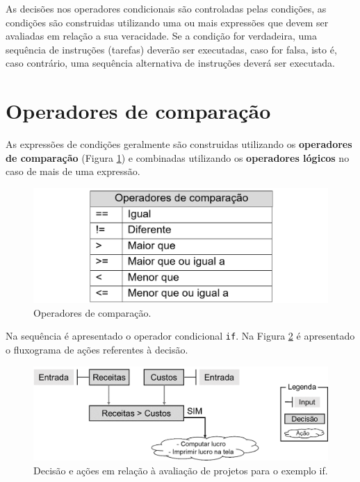 \documentclass[
  11pt,
  a5paper,
  openany]{book}
\begin{document}
As decisões nos operadores condicionais são controladas pelas condições, as condições são construidas utilizando uma ou mais expressões que devem ser avaliadas em relação a sua veracidade. Se a condição for verdadeira, uma sequência de instruções (tarefas) deverão ser executadas, caso for falsa, isto é, caso contrário, uma sequência alternativa de instruções deverá ser executada.

\hypertarget{operadores-de-comparauxe7uxe3o}{%
\section{Operadores de comparação}\label{operadores-de-comparauxe7uxe3o}}

As expressões de condições geralmente são construidas utilizando os \textbf{operadores de comparação} (Figura \ref{fig:FigCond2}) e combinadas utilizando os \textbf{operadores lógicos} no caso de mais de uma expressão.

\begin{figure}

{\centering \includegraphics[width=1\linewidth]{images/Fig_Cond2} 

}

\caption{Operadores de comparação.}\label{fig:FigCond2}
\end{figure}

Na sequência é apresentado o operador condicional \texttt{if}. Na Figura \ref{fig:FigCond3} é apresentado o fluxograma de ações referentes à decisão.

\begin{figure}

{\centering \includegraphics[width=1\linewidth]{images/Fig_Cond3} 

}

\caption{Decisão e ações em relação à avaliação de projetos para o exemplo if.}\label{fig:FigCond3}
\end{figure}
\end{document}
